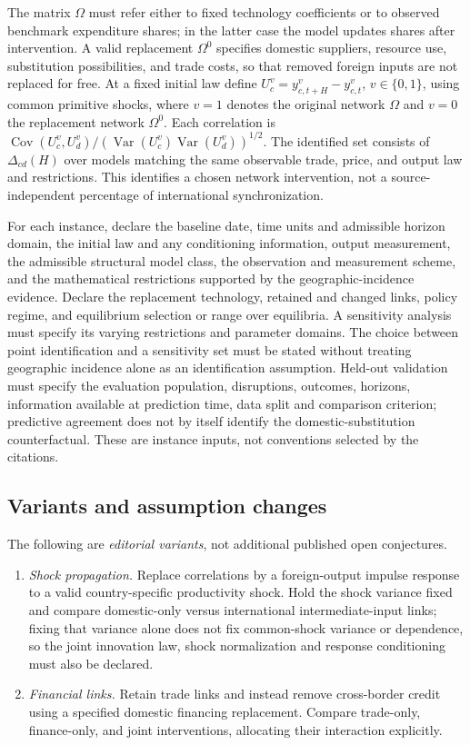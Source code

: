 \documentclass[11pt,a4paper]{article}
\begin{document}
The matrix \(\Omega\) must refer either to fixed technology coefficients or to observed benchmark expenditure shares; in the latter case the model updates shares after intervention. A valid replacement \(\Omega^0\) specifies domestic suppliers, resource use, substitution possibilities, and trade costs, so that removed foreign inputs are not replaced for free. At a fixed initial law define \(U_c^v=y_{c,t+H}^v-y_{c,t}^v\), \(v\in\{0,1\}\), using common primitive shocks, where \(v=1\) denotes the original network \(\Omega\) and \(v=0\) the replacement network \(\Omega^0\). Each correlation is \(\operatorname{Cov}(U_c^v,U_d^v)/(\operatorname{Var}(U_c^v)\operatorname{Var}(U_d^v))^{1/2}\). The identified set consists of \(\Delta_{cd}(H)\) over models matching the same observable trade, price, and output law and restrictions. This identifies a chosen network intervention, not a source-independent percentage of international synchronization.

For each instance, declare the baseline date, time units and admissible horizon domain, the initial law and any conditioning information, output measurement, the admissible structural model class, the observation and measurement scheme, and the mathematical restrictions supported by the geographic-incidence evidence. Declare the replacement technology, retained and changed links, policy regime, and equilibrium selection or range over equilibria. A sensitivity analysis must specify its varying restrictions and parameter domains. The choice between point identification and a sensitivity set must be stated without treating geographic incidence alone as an identification assumption. Held-out validation must specify the evaluation population, disruptions, outcomes, horizons, information available at prediction time, data split and comparison criterion; predictive agreement does not by itself identify the domestic-substitution counterfactual. These are instance inputs, not conventions selected by the citations.
\subsection*{Variants and assumption changes}
The following are \emph{editorial variants}, not additional published open conjectures.
\begin{enumerate}
\item \emph{Shock propagation.} Replace correlations by a foreign-output impulse response to a valid country-specific productivity shock. Hold the shock variance fixed and compare domestic-only versus international intermediate-input links; fixing that variance alone does not fix common-shock variance or dependence, so the joint innovation law, shock normalization and response conditioning must also be declared.
\item \emph{Financial links.} Retain trade links and instead remove cross-border credit using a specified domestic financing replacement. Compare trade-only, finance-only, and joint interventions, allocating their interaction explicitly.
\end{enumerate}
\end{document}
